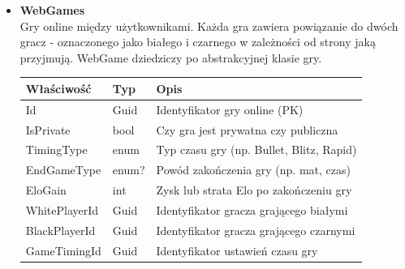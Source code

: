 \documentclass[twoside]{projektInzynierskiMS1}
\begin{document}
\begin{itemize}
\newpage

    \item \textbf{WebGames}\\
    Gry online między użytkownikami. Każda gra zawiera powiązanie do dwóch gracz - oznaczonego jako białego i czarnego w zależności od strony jaką przyjmują. WebGame dziedziczy po abstrakcyjnej klasie gry.
    \renewcommand{\arraystretch}{1.2}
    \begin{longtable}{|m{4cm}|m{2cm}|m{8cm}|}
        \hline
        \rowcolor{lightgray}
        \textbf{Właściwość} & \textbf{Typ} & \textbf{Opis} \\ \hline
        \endhead
        \hline
        Id & Guid & Identyfikator gry online (PK) \\ \hline
        IsPrivate & bool & Czy gra jest prywatna czy publiczna \\ \hline
        TimingType & enum & Typ czasu gry (np. Bullet, Blitz, Rapid) \\ \hline
        EndGameType & enum? & Powód zakończenia gry (np. mat, czas) \\ \hline
        EloGain & int & Zysk lub strata Elo po zakończeniu gry \\ \hline
        WhitePlayerId & Guid & Identyfikator gracza grającego białymi \\ \hline
        BlackPlayerId & Guid & Identyfikator gracza grającego czarnymi \\ \hline
        GameTimingId & Guid & Identyfikator ustawień czasu gry \\ \hline
    \end{longtable}


\end{itemize}
\end{document}
